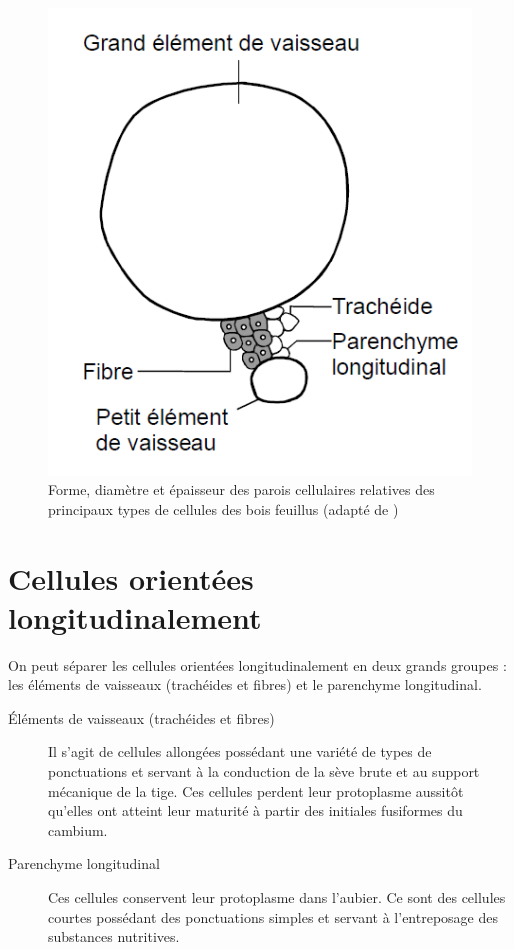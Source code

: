 \begin{figure}[h]
\centering
\includegraphics[scale=0.5]{img/ch4_form_cell_X}
\caption{Forme, diamètre et épaisseur des parois cellulaires relatives des principaux types de cellules des bois feuillus (adapté de \cite{hoadley1990identifying})}
\label{fig:ch4_form_cell_X}
\end{figure}

\section{Cellules orientées longitudinalement}

On peut séparer les cellules orientées longitudinalement en deux grands groupes : les éléments de vaisseaux (trachéides et fibres) et le parenchyme longitudinal.

\begin{description}
\item[Éléments de vaisseaux (trachéides et fibres)] Il s'agit de cellules allongées possédant une variété de types de ponctuations et servant à la conduction de la sève brute et au support mécanique de la tige. Ces cellules perdent leur protoplasme aussitôt qu'elles ont atteint leur maturité à partir des initiales fusiformes du cambium.

\item[Parenchyme longitudinal] Ces cellules conservent leur protoplasme dans l'aubier. Ce sont des cellules courtes possédant des ponctuations simples et servant à l'entreposage des substances nutritives.
\end{description}

